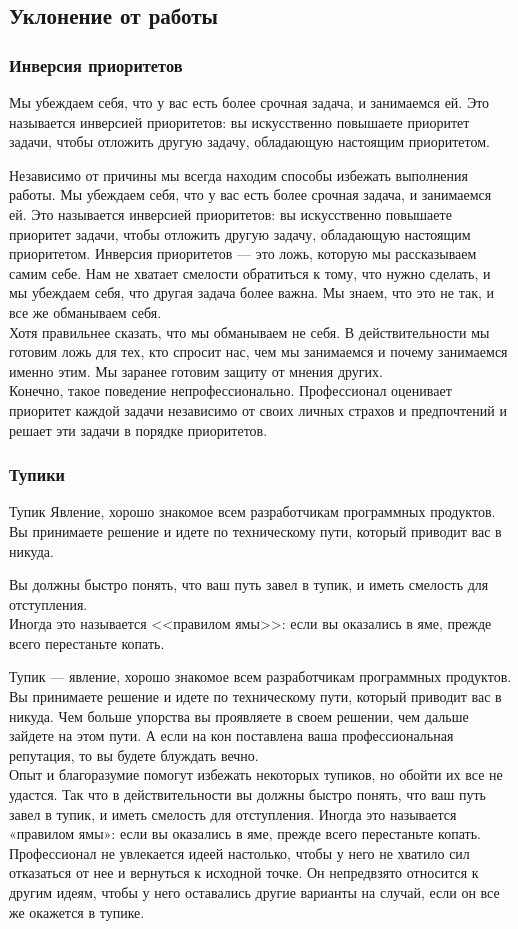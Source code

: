 \documentclass{../industrial-development}
\begin{document}
\subsection{Уклонение от работы}
\begin{frame} \frametitle{Инверсия приоритетов}
\begin{block}{}
Мы убеждаем себя, что у вас есть более срочная задача,
и занимаемся ей. Это называется инверсией приоритетов: вы искусственно повышаете приоритет задачи, чтобы отложить другую задачу,
обладающую настоящим приоритетом.
\end{block}
\end{frame}
\lecturenotes
Независимо от причины мы всегда находим способы избежать выполнения работы. Мы убеждаем себя, что у вас есть более срочная задача, и занимаемся ей. Это называется инверсией приоритетов: вы искусственно повышаете приоритет задачи, чтобы отложить другую задачу, обладающую настоящим приоритетом. Инверсия приоритетов — это ложь, которую мы рассказываем самим себе. Нам не хватает смелости обратиться к тому, что нужно сделать, и мы убеждаем себя, что другая задача более важна. Мы знаем, что это не так, и все же обманываем себя.\\
Хотя правильнее сказать, что мы обманываем не себя. В действительности мы готовим ложь для тех, кто спросит нас, чем мы занимаемся и почему занимаемся именно этим. Мы заранее готовим защиту от мнения других.\\
Конечно, такое поведение непрофессионально. Профессионал оценивает приоритет каждой задачи независимо от своих личных страхов и предпочтений и решает эти задачи в порядке приоритетов.

\begin{frame} \frametitle{Тупики}
\begin{block}{Тупик}
Явление, хорошо знакомое всем разработчикам программных
продуктов. Вы принимаете решение и идете по техническому пути,
который приводит вас в никуда. 
\end{block}
Вы должны быстро понять, что ваш путь завел в тупик, и иметь смелость для отступления.\\
Иногда это называется <<правилом ямы>>: если вы оказались в яме, прежде всего перестаньте копать.
\end{frame}
\lecturenotes
Тупик — явление, хорошо знакомое всем разработчикам программных продуктов. Вы принимаете решение и идете по техническому пути, который приводит вас в никуда. Чем больше упорства вы проявляете в своем решении, чем дальше зайдете на этом пути. А если на кон поставлена ваша профессиональная репутация, то вы будете блуждать вечно.\\
Опыт и благоразумие помогут избежать некоторых тупиков, но обойти их все не удастся. Так что в действительности вы должны быстро понять, что ваш путь завел в тупик, и иметь смелость для отступления. Иногда это называется «правилом ямы»: если вы оказались в яме, прежде всего перестаньте копать.\\
Профессионал не увлекается идеей настолько, чтобы у него не хватило сил отказаться от нее и вернуться к исходной точке. Он непредвзято относится к другим идеям, чтобы у него оставались другие варианты на случай, если он все же окажется в тупике.
\end{document}
